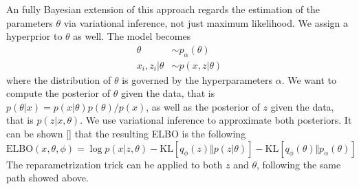 An fully Bayesian extension of this approach regards the estimation of the parameters $\theta$ via variational inference, not just maximum likelihood. We assign a hyperprior to $\theta$ as well. The model becomes
\begin{align*}
    \theta &\sim p_\alpha(\theta)\\
    x_i, z_i | \theta &\sim p(x, z | \theta)
\end{align*}
where the distribution of $\theta$ is governed by the hyperparameters $\alpha$. We want to compute the posterior of $\theta$ given the data, that is $p(\theta|x) = p(x|\theta)p(\theta)/p(x)$, as well as the posterior of $z$ given the data, that is $p(z|x, \theta)$. We use variational inference to approximate both posteriors. %
It can be shown [\cite{Kingma2013}] that the resulting ELBO is the following
$$\mathrm{ELBO}(x,\theta,\phi) = \log p(x|z, \theta) - \mathrm{KL}[q_\phi(z)\Vert p(z|\theta)] - \mathrm{KL}[q_\phi(\theta)\Vert p_\alpha(\theta)]$$
The reparametrization trick can be applied to both $z$ and $\theta$, following the same path showed above.




